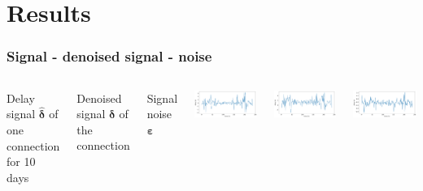 \documentclass{beamer}
\begin{document}
\section{Results}
\begin{frame}
\frametitle{Signal - denoised signal - noise}
\begin{columns}
Delay signal $\bm{\hat{\delta}}$ of one connection for 10 days

\vspace{1.5cm}

Denoised signal $\bm{\delta}$ of the connection

\vspace{1.5cm}

Signal noise $\bm{\varepsilon}$

\includegraphics[height=0.28\textheight]{../figures/noisy-time-delay-data-10-days.png}

\includegraphics[height=0.28\textheight]{../figures/denoised-time-delay-data-ten-days.png}

\includegraphics[height=0.28\textheight]{../figures/the-noise-ten-days.png}

\end{columns}

\end{frame}
\end{document}
